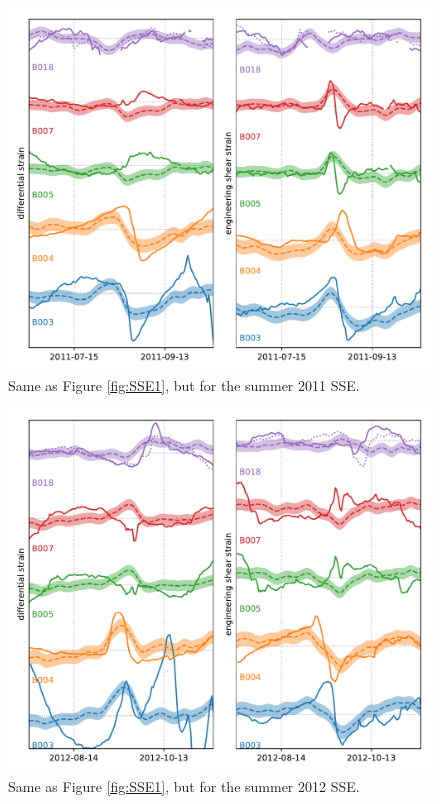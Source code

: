 \documentclass[10pt,a4paper]{article}
\begin{document}
\begin{figure}
\includegraphics{figures/SSE2.pdf}
\caption{Same as Figure \ref{fig:SSE1}, but for the summer 2011 SSE.}   
\label{fig:SSE2}
\end{figure}

\begin{figure}
\includegraphics{figures/SSE3.pdf}
\caption{Same as Figure \ref{fig:SSE1}, but for the summer 2012 SSE.}   
\label{fig:SSE3}
\end{figure}
\end{document}
